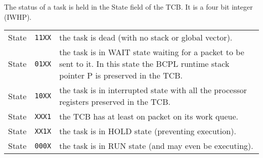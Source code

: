      The status of a task is held in the State field of the TCB.  It is a 
four bit integer (IWHP).

\begin{tabular}{llp{8.5cm}}
     State&{\tt 11XX}&the task is dead (with no stack or global vector).\\
     State&{\tt 01XX}&the task is in WAIT state waiting for a packet to be 
                      sent to it.  In this state the BCPL runtime stack 
                      pointer P is preserved in the TCB.\\
     State&{\tt 10XX}&the task is in interrupted state with all the 
                      processor registers preserved in the TCB.\\
     State&{\tt XXX1}&the TCB has at least on packet on its work queue.\\
     State&{\tt XX1X}&the task is in HOLD state (preventing execution).\\
     State&{\tt 000X}&the task is in RUN state (and may even be executing).\\
\end{tabular}


